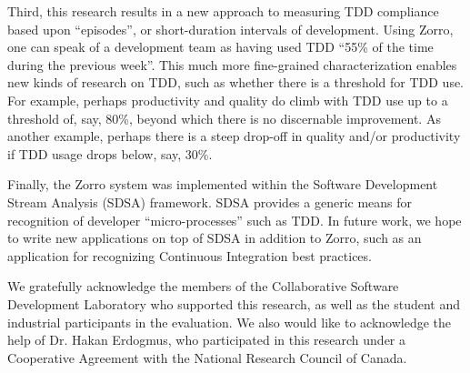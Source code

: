 \documentclass[smallextended]{svjour3}     %
\begin{document}
Third, this research results in a new approach to measuring TDD compliance
based upon ``episodes'', or short-duration intervals of development.  Using
Zorro, one can speak of a development team as having used TDD ``55\% of the
time during the previous week''.  This much more fine-grained
characterization enables new kinds of research on TDD, such as whether
there is a threshold for TDD use.  For example, perhaps productivity and
quality do climb with TDD use up to a threshold of, say, 80\%, beyond which
there is no discernable improvement.  As another example, perhaps there is
a steep drop-off in quality and/or productivity if TDD usage drops below,
say, 30\%.

Finally, the Zorro system was implemented within the Software Development
Stream Analysis (SDSA) framework.  SDSA provides a generic means for
recognition of developer ``micro-processes'' such as TDD.  In future work,
we hope to write new applications on top of SDSA in addition to Zorro, such
as an application for recognizing Continuous Integration best practices.

\begin{acknowledgements}
We gratefully acknowledge the members of the Collaborative Software Development Laboratory who supported this research, 
as well as the student and industrial participants in the evaluation.  We also would like to acknowledge the help of Dr. Hakan 
Erdogmus, who participated in this research under a Cooperative Agreement with the National Research Council of Canada.
\end{acknowledgements}


\end{document}
